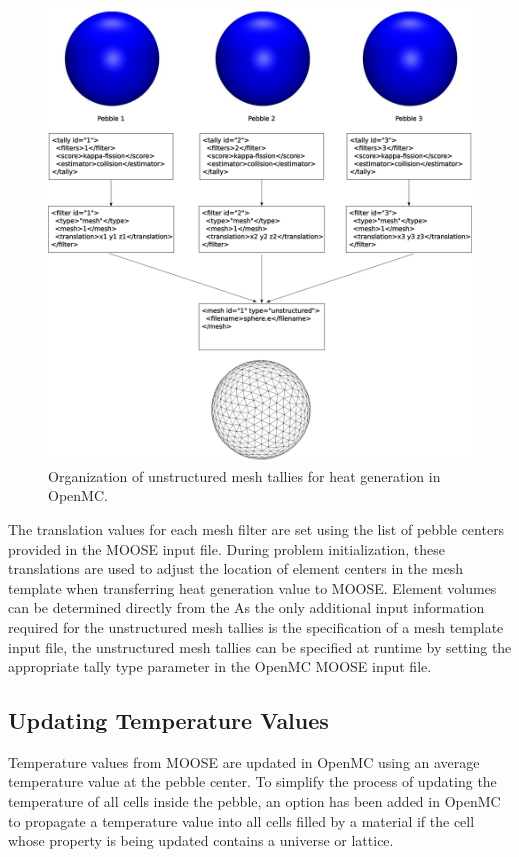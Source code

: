 \begin{figure}[ht]
    \centering
    \includegraphics[width=\textwidth]{Figures/umesh_tally_diagram}
    \caption{Organization of unstructured mesh tallies for heat generation in OpenMC.}
    \label{fig:umesh_tally_steup}
\end{figure}

The translation values for each mesh filter are set using the list of pebble centers provided in the MOOSE input file. During problem initialization, these translations are used to adjust the location of element centers in the mesh template when transferring heat generation value to MOOSE. Element volumes can be determined directly from the As the only additional input information required for the unstructured mesh tallies is the specification of a mesh template input file, the unstructured mesh tallies can be specified at runtime by setting the appropriate tally type parameter in the OpenMC MOOSE input file.

\subsection{Updating Temperature Values}

Temperature values from MOOSE are updated in OpenMC using an average temperature value at the pebble center. To simplify the process of updating the temperature of all cells inside the pebble, an option has been added in OpenMC to propagate a temperature value into all cells filled by a material if the cell whose property is being updated contains a universe or lattice.
